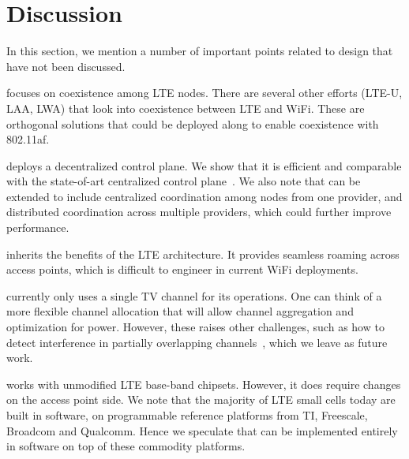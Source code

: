 \section {Discussion}

In this section, we mention a number of important points related to \cf design that have not been discussed.

 \cf focuses on coexistence among LTE nodes. There are several other efforts (LTE-U, LAA, LWA) that look into coexistence between LTE and WiFi. 
These are orthogonal solutions that could be
deployed along \cf to enable coexistence with 802.11af. 

 \cf deploys a decentralized control plane. We show that it is efficient and comparable with the state-of-art centralized control plane~\cite{fermi}. 
We also note that \cf can be extended to include centralized coordination among nodes from one provider, and distributed coordination across multiple providers, which could further improve performance. 

 \cf inherits the benefits of the LTE architecture.
It provides seamless roaming across access points, which is difficult to engineer in current WiFi deployments. 

 \cf currently only uses a single TV channel for its operations. One can think of a more flexible channel allocation that will allow channel aggregation and optimization for power. However, these raises other challenges, such as how to detect interference in partially overlapping channels~\cite{whitefi}, which we leave as future work.

 \cf works with unmodified LTE base-band chipsets. However, it does require changes on the access point side. We note that the majority of LTE small cells today are built in software, on programmable reference platforms from TI, Freescale, Broadcom and Qualcomm. Hence we speculate that \cf can be implemented entirely in software on top of these commodity platforms. 

